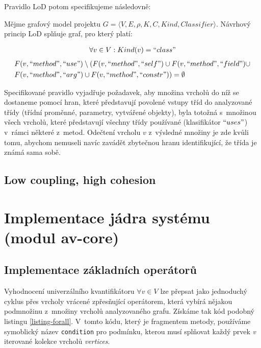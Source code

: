 Pravidlo LoD potom specifikujeme následovně:

\begin{designprinciple}
Mějme grafový model projektu $G = \langle V, E, \rho, K, C, \mathit{Kind}, \mathit{Classifier}\rangle$. Návrhový princip LoD splňuje graf, pro který platí:

\begin{align*}
\forall v \in V: Kind(v) = ``class"\\
\end{align*}
\begin{align*}
&F(v, ``method", ``use") \setminus ( F(v, ``method", ``self") \cup F(v, ``method", ``field") \cup \\
&F(v, ``method", ``arg") \cup F(v, ``method", ``constr")) = \emptyset
\end{align*}

\end{designprinciple}

Specifikované pravidlo vyjadřuje požadavek, aby množina vrcholů do níž se dostaneme pomocí hran, které představují povolené vstupy tříd do analyzované třídy (třídní proměnné, parametry, vytvářené objekty), byla totožná s~množinou všech vrcholů, které představují všechny třídy používané (klasifikátor $``uses"$) v~rámci některé z~metod. Odečtení vrcholu $v$ z~výsledné množiny je zde kvůli tomu, abychom nemuseli navíc zavádět zbytečnou hranu identifikující, že třída je známá sama sobě.

\subsection{Low coupling, high cohesion}

\section{Implementace jádra systému (modul av-core)}

\subsection{Implementace základních operátorů}
Vyhodnocení univerzálního kvantifikátoru $\forall v \in V$ lze přepsat jako jednoduchý cyklus přes vrcholy vrácené zpřesňující operátorem, která vybírá nějakou podmnožinu z~množiny vrcholů analyzovaného grafu. Získáme tak kód podobný listingu \ref{listing-forall}. V~tomto kódu, který je fragmentem metody, používáme symoblický název \verb+condition+ pro podmínku, kterou musí splňovat každý prvek \emph{v} iterované kolekce vrcholů \emph{vertices}.

